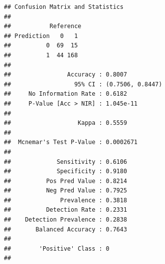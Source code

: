 \documentclass[
]{article}
\newenvironment{Shaded}{\begin{snugshade}}{\end{snugshade}}
\newcommand{\AttributeTok}[1]{\textcolor[rgb]{0.13,0.29,0.53}{#1}}
\newcommand{\DecValTok}[1]{\textcolor[rgb]{0.00,0.00,0.81}{#1}}
\newcommand{\FloatTok}[1]{\textcolor[rgb]{0.00,0.00,0.81}{#1}}
\newcommand{\FunctionTok}[1]{\textcolor[rgb]{0.13,0.29,0.53}{\textbf{#1}}}
\newcommand{\NormalTok}[1]{#1}
\newcommand{\OtherTok}[1]{\textcolor[rgb]{0.56,0.35,0.01}{#1}}
\newcommand{\SpecialCharTok}[1]{\textcolor[rgb]{0.81,0.36,0.00}{\textbf{#1}}}
\newcommand{\StringTok}[1]{\textcolor[rgb]{0.31,0.60,0.02}{#1}}
\begin{document}
\begin{Shaded}
\end{Shaded}

\begin{verbatim}
## Confusion Matrix and Statistics
## 
##           Reference
## Prediction   0   1
##          0  69  15
##          1  44 168
##                                           
##                Accuracy : 0.8007          
##                  95% CI : (0.7506, 0.8447)
##     No Information Rate : 0.6182          
##     P-Value [Acc > NIR] : 1.045e-11       
##                                           
##                   Kappa : 0.5559          
##                                           
##  Mcnemar's Test P-Value : 0.0002671       
##                                           
##             Sensitivity : 0.6106          
##             Specificity : 0.9180          
##          Pos Pred Value : 0.8214          
##          Neg Pred Value : 0.7925          
##              Prevalence : 0.3818          
##          Detection Rate : 0.2331          
##    Detection Prevalence : 0.2838          
##       Balanced Accuracy : 0.7643          
##                                           
##        'Positive' Class : 0               
## 
\end{verbatim}

\begin{Shaded}
\end{Shaded}
\end{document}
